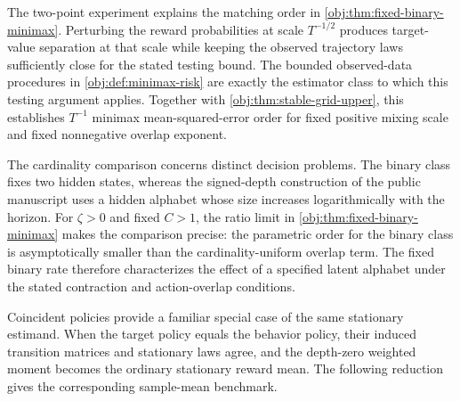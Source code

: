 \documentclass[11pt]{article}
\begin{document}

The two-point experiment explains the matching order in \cref{obj:thm:fixed-binary-minimax}. Perturbing the reward probabilities at scale \(T^{-1/2}\) produces target-value separation at that scale while keeping the observed trajectory laws sufficiently close for the stated testing bound. The bounded observed-data procedures in \cref{obj:def:minimax-risk} are exactly the estimator class to which this testing argument applies. Together with \cref{obj:thm:stable-grid-upper}, this establishes \(T^{-1}\) minimax mean-squared-error order for fixed positive mixing scale and fixed nonnegative overlap exponent.

The cardinality comparison concerns distinct decision problems. The binary class fixes two hidden states, whereas the signed-depth construction of the public manuscript \citet[Theorem 1 (Uniform overlap frontier) and the Signed-depth family definition]{CausalSmithLatentOverlap2026} uses a hidden alphabet whose size increases logarithmically with the horizon. For \(\zeta>0\) and fixed \(C>1\), the ratio limit in \cref{obj:thm:fixed-binary-minimax} makes the comparison precise: the parametric order for the binary class is asymptotically smaller than the cardinality-uniform overlap term. The fixed binary rate therefore characterizes the effect of a specified latent alphabet under the stated contraction and action-overlap conditions.

Coincident policies provide a familiar special case of the same stationary estimand. When the target policy equals the behavior policy, their induced transition matrices and stationary laws agree, and the depth-zero weighted moment becomes the ordinary stationary reward mean. The following reduction gives the corresponding sample-mean benchmark.
\end{document}
